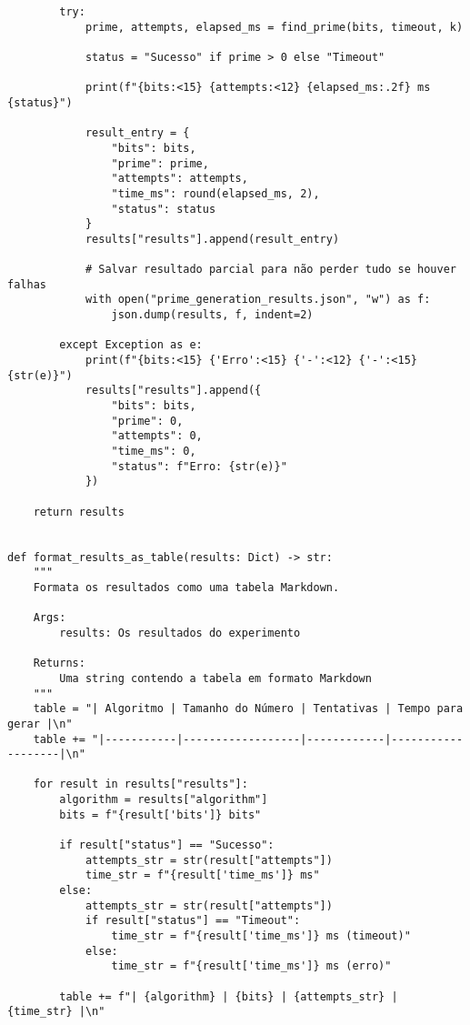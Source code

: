 \begin{verbatim}
        try:
            prime, attempts, elapsed_ms = find_prime(bits, timeout, k)
            
            status = "Sucesso" if prime > 0 else "Timeout"
            
            print(f"{bits:<15} {attempts:<12} {elapsed_ms:.2f} ms      {status}")
            
            result_entry = {
                "bits": bits,
                "prime": prime,
                "attempts": attempts,
                "time_ms": round(elapsed_ms, 2),
                "status": status
            }
            results["results"].append(result_entry)
            
            # Salvar resultado parcial para não perder tudo se houver falhas
            with open("prime_generation_results.json", "w") as f:
                json.dump(results, f, indent=2)
                
        except Exception as e:
            print(f"{bits:<15} {'Erro':<15} {'-':<12} {'-':<15} {str(e)}")
            results["results"].append({
                "bits": bits,
                "prime": 0,
                "attempts": 0,
                "time_ms": 0,
                "status": f"Erro: {str(e)}"
            })
    
    return results


def format_results_as_table(results: Dict) -> str:
    """
    Formata os resultados como uma tabela Markdown.
    
    Args:
        results: Os resultados do experimento
        
    Returns:
        Uma string contendo a tabela em formato Markdown
    """
    table = "| Algoritmo | Tamanho do Número | Tentativas | Tempo para gerar |\n"
    table += "|-----------|------------------|------------|-------------------|\n"
    
    for result in results["results"]:
        algorithm = results["algorithm"]
        bits = f"{result['bits']} bits"
        
        if result["status"] == "Sucesso":
            attempts_str = str(result["attempts"])
            time_str = f"{result['time_ms']} ms"
        else:
            attempts_str = str(result["attempts"])
            if result["status"] == "Timeout":
                time_str = f"{result['time_ms']} ms (timeout)"
            else:
                time_str = f"{result['time_ms']} ms (erro)"
        
        table += f"| {algorithm} | {bits} | {attempts_str} | {time_str} |\n"
    

\end{verbatim}
